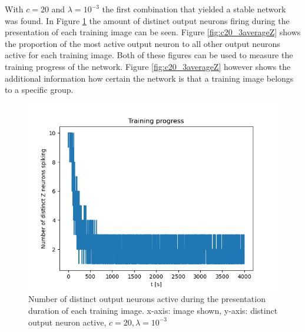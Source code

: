 With $c = 20$ and $\lambda = 10^{-3}$ the first combination that yielded a stable network was found. In Figure \ref{fig:c20_3Distinct} the amount of distinct output neurons firing during the presentation of each training image can be seen. Figure \ref{fig:c20_3averageZ} shows the proportion of the most active output neuron to all other output neurons active for each training image. Both of these figures can be used to measure the training progress of the network. Figure \ref{fig:c20_3averageZ} however shows the additional information how certain the network is that a training image belongs to a specific group.

\begin{figure}
  \includegraphics[width=\linewidth]{figures/angleNetwork/c20_3distinctZ.png}
  \caption{Number of distinct output neurons active during the presentation duration of each training image. x-axis: image shown, y-axis: distinct output neuron active, $c = 20, \lambda = 10^{-3}$}
  \label{fig:c20_3Distinct}
\end{figure}

